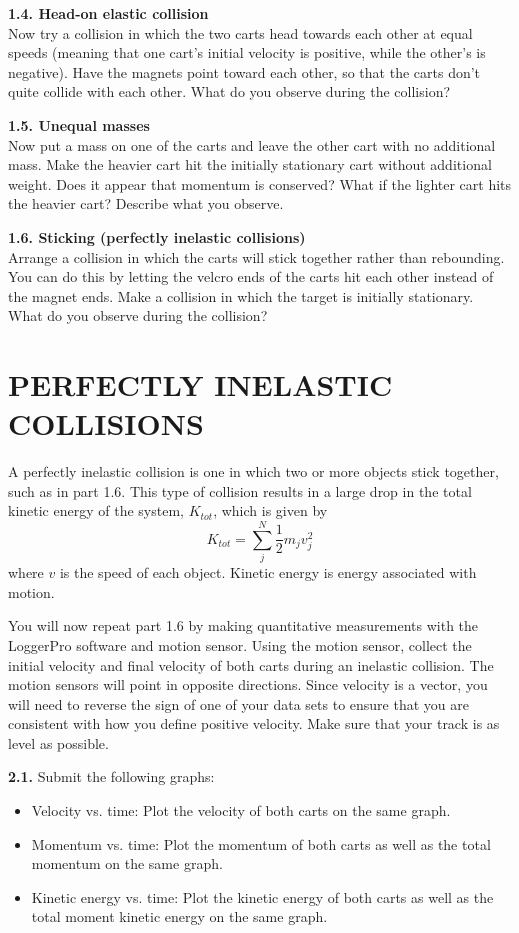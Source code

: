 \documentclass[11pt,letterpaper]{article}
\begin{document}
{\bf 1.4. Head-on elastic collision}\\
Now try a collision in which the two carts head towards each other at equal speeds (meaning that one cart's initial velocity is positive, while the other's is negative). Have the magnets point toward each other, so that the carts don't quite collide with each other. What do
you observe during the collision?

{\bf 1.5. Unequal masses}\\ 
Now put a mass on one of the carts and leave
the other cart with no additional mass.  Make the heavier cart hit the
initially stationary cart without additional weight. Does it appear
that momentum is conserved? What if the lighter cart hits the heavier cart? Describe what you observe.

{\bf 1.6. Sticking (perfectly inelastic collisions)}\\ 
Arrange a collision in which the carts will stick together rather than rebounding.  You can do this by letting the velcro ends of the carts hit each other instead of the
magnet ends.  Make a collision in which the target is initially stationary.  What do you observe during the collision?


\section{PERFECTLY INELASTIC COLLISIONS}
A perfectly inelastic collision is one in which two or more objects stick together, such as in part 1.6. This type of collision results in a large drop in the total kinetic energy of the system, $K_{tot}$, which is given by
$$K_{tot} = \sum_j^N \frac{1}{2}m_jv_j^2$$
where $v$ is the speed of each object. Kinetic energy is energy associated with motion.
 
You will now repeat part 1.6 by making quantitative measurements with the LoggerPro software and motion sensor. Using the motion sensor, collect the initial velocity and final velocity of both carts during an inelastic collision. The motion sensors will point in opposite directions. Since velocity is a vector, you will need to reverse the sign of one of your data sets to ensure that you are consistent with how you define positive velocity. Make sure that your track is as level as possible.

\textbf{2.1.} Submit the following graphs:
\begin{itemize}
\item Velocity vs. time: Plot the velocity of both carts on the same graph. 
\item Momentum vs. time: Plot the momentum of both carts as well as the total momentum on the same graph. 
\item Kinetic energy vs. time: Plot the kinetic energy of both carts as well as the total moment kinetic energy on the same graph. 
\end{itemize}
\end{document}
